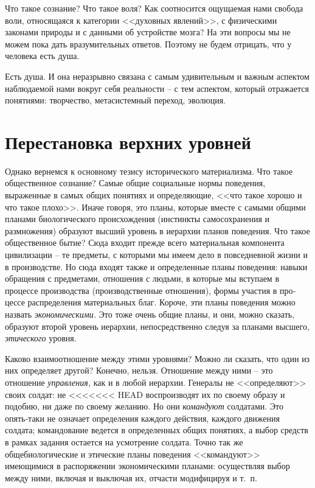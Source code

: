 \documentclass{book}
\begin{document}
Что такое сознание? Что такое воля? Как соотносится ощу­щаемая нами свобода воли, относящаяся к категории <<духовных явлений>>, с 
физическими законами природы и с данными об устройстве мозга? На эти вопросы мы не можем пока дать вразумительных ответов. 
Поэтому не будем отрицать, что у человека есть душа.

Есть душа. И она неразрывно связана с самым удивительным и важным аспектом наблюдаемой нами вокруг себя реальности -- с тем аспектом, который отражается понятиями: творчество, метасистемный переход, эволюция.


\section{Перестановка верхних уровней}

Однако вернемся к основному тезису исторического материализма. Что такое общественное сознание? Самые общие социальные нормы 
поведения, выраженные в самых общих понятиях и определяющие, <<что такое хорошо и что такое плохо>>. Иначе говоря, это планы, 
которые вместе с самыми общими планами биологического происхождения (инстинкты самосохранения и размножения) образуют высший 
уровень в иерархии планов поведения. Что такое общественное бытие? Сюда входит прежде всего материальная компонента цивили­зации 
-- те предметы, с которыми мы имеем дело в повседнев­ной жизни и в производстве. Но сюда входят также и опреде­ленные планы 
поведения: навыки обращения с предметами, отношения с людьми, в которые мы вступаем в процессе произ­водства (производственные 
отношения), формы участия в про­цессе распределения материальных благ. Короче, эти планы по­ведения можно назвать 
\textit{экономическими.}  Это тоже очень общие планы, и они, можно сказать, образуют второй уровень иерар­хии, непосредственно 
следуя за планами высшего, \textit{этического} уровня.

Каково взаимоотношение между этими уровнями? Можно ли сказать, что один из них определяет другой? Конечно, нель­зя. Отношение 
между ними -- это отношение \textit{управления,}  как и в любой иерархии. Генералы не <<определяют>> своих солдат: не 
<<<<<<< HEAD
воспроизводят их по своему образу и подобию, ни даже по своему желанию. Но они \textit{командуют} солдатами. Это опять‑таки не 
означает определения каждого действия, каждого движения солдата; командование ведется в определенных об­щих понятиях, а выбор 
средств в рамках задания остается на ус­мотрение солдата. Точно так же общебиологические и этические планы поведения <<командуют>> 
имеющимися в распоряжении экономическими планами: осуществляя выбор между ними, включая и выключая их, отчасти модифицируя и 
т.~п.
\end{document}
